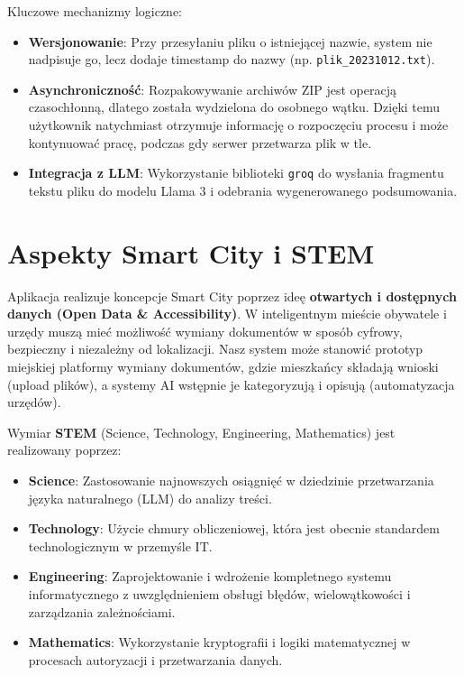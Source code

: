 \documentclass[12pt,a4paper]{article}
\begin{document}
	Kluczowe mechanizmy logiczne:
	\begin{itemize}
		\item \textbf{Wersjonowanie}: Przy przesyłaniu pliku o istniejącej nazwie, system nie nadpisuje go, lecz dodaje timestamp do nazwy (np. \texttt{plik\_20231012.txt}).
		\item \textbf{Asynchroniczność}: Rozpakowywanie archiwów ZIP jest operacją czasochłonną, dlatego została wydzielona do osobnego wątku. Dzięki temu użytkownik natychmiast otrzymuje informację o rozpoczęciu procesu i może kontynuować pracę, podczas gdy serwer przetwarza plik w tle.
		\item \textbf{Integracja z LLM}: Wykorzystanie biblioteki \texttt{groq} do wysłania fragmentu tekstu pliku do modelu Llama 3 i odebrania wygenerowanego podsumowania.
	\end{itemize}
	
	\newpage
	\section{Aspekty Smart City i STEM}
	Aplikacja realizuje koncepcje Smart City poprzez ideę \textbf{otwartych i dostępnych danych (Open Data \& Accessibility)}. W inteligentnym mieście obywatele i urzędy muszą mieć możliwość wymiany dokumentów w sposób cyfrowy, bezpieczny i niezależny od lokalizacji. Nasz system może stanowić prototyp miejskiej platformy wymiany dokumentów, gdzie mieszkańcy składają wnioski (upload plików), a systemy AI wstępnie je kategoryzują i opisują (automatyzacja urzędów).
	
	Wymiar \textbf{STEM} (Science, Technology, Engineering, Mathematics) jest realizowany poprzez:
	\begin{itemize}
		\item \textbf{Science}: Zastosowanie najnowszych osiągnięć w dziedzinie przetwarzania języka naturalnego (LLM) do analizy treści.
		\item \textbf{Technology}: Użycie chmury obliczeniowej, która jest obecnie standardem technologicznym w przemyśle IT.
		\item \textbf{Engineering}: Zaprojektowanie i wdrożenie kompletnego systemu informatycznego z uwzględnieniem obsługi błędów, wielowątkowości i zarządzania zależnościami.
		\item \textbf{Mathematics}: Wykorzystanie kryptografii i logiki matematycznej w procesach autoryzacji i przetwarzania danych.
	\end{itemize}
	
	\newpage
\end{document}
